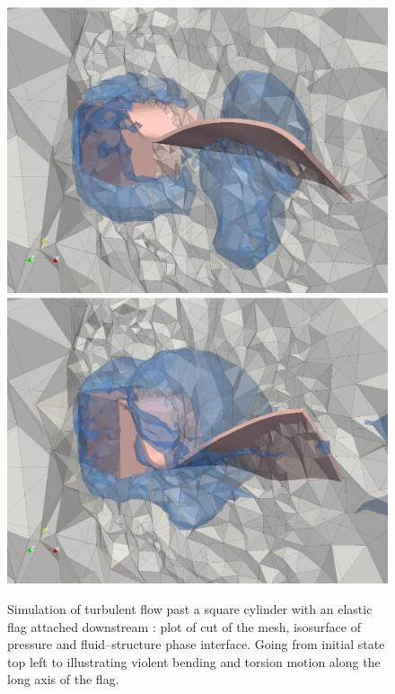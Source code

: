 \begin{figure}
  \includegraphics[width=\twofigs]{chapters/hoffman-1/png/cube550.png}
  \includegraphics[width=\twofigs]{chapters/hoffman-1/png/cube649.png}\\
  \caption{Simulation of turbulent flow past a square cylinder with an
    elastic flag attached downstream \citep{HoffmanJanssonStockli2011}: plot
    of cut of the mesh, isosurface of pressure and fluid--structure phase
    interface. Going from initial state top left to illustrating violent
    bending and torsion motion along the long axis of the flag.}
  \label{hoffman-1:fig:flag}
\end{figure}
